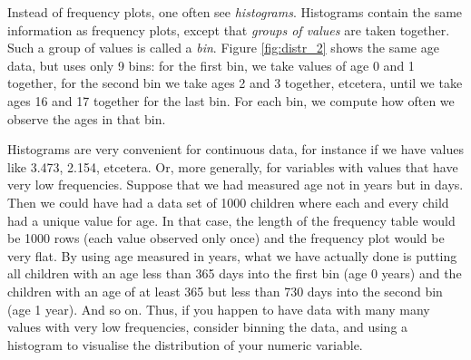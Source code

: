 
Instead of frequency plots, one often see \textit{histograms}. Histograms contain the same information as frequency plots, except that \textit{groups of values} are taken together. Such a group of values is called a \textit{bin}. Figure \ref{fig:distr_2} shows the same age data, but uses only 9 bins: for the first bin, we take values of age 0 and 1 together, for the second bin we take ages 2 and 3 together, etcetera, until we take ages 16 and 17 together for the last bin. For each bin, we compute how often we observe the ages in that bin.

Histograms are very convenient for continuous data, for instance if we have values like 3.473, 2.154, etcetera. Or, more generally, for variables with values that have very low frequencies. Suppose that we had measured age not in years but in days. Then we could have had a data set of 1000 children where each and every child had a unique value for age. In that case, the length of the frequency table would be 1000 rows (each value observed only once) and the frequency plot would be very flat. By using age measured in years, what we have actually done is putting all children with an age less than 365 days into the first bin (age 0 years) and the children with an age of at least 365 but less than 730 days into the second bin (age 1 year). And so on. Thus, if you happen to have data with many many values with very low frequencies, consider binning the data, and using a histogram to visualise the distribution of your numeric variable.



\begin{knitrout}
\color{fgcolor}\begin{kframe}


{\ttfamily\noindent\bfseries{}}\end{kframe}
\end{knitrout}



